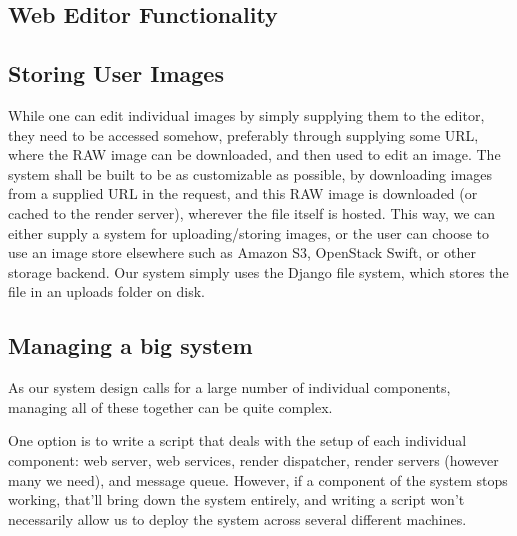 \documentclass[12pt,a4paper]{article}
\begin{document}
\subsection{Web Editor Functionality}


\subsection{Storing User Images}
While one can edit individual images by simply supplying them to the editor, they need to be accessed somehow,
preferably through supplying some URL, where the RAW image can be downloaded, and then used to edit an image.
The system shall be built to be as customizable as possible, by downloading images from a supplied URL in the request,
and this RAW image is downloaded (or cached to the render server), wherever the file itself is hosted. This way, we can
either supply a system for uploading/storing images, or the user can choose to use an image store elsewhere such as Amazon
S3, OpenStack Swift, or other storage backend. Our system simply uses the Django file system, which stores the file in an
uploads folder on disk.



\subsection{Managing a big system}
As our system design calls for a large number of individual components, managing all of these together can be quite complex.

One option is to write a script that deals with the setup of each individual component: web server, web services, render dispatcher, render servers (however many we need),
and message queue. However, if a component of the system stops working, that'll bring down the system entirely, and writing a script won't necessarily allow us to deploy the system
across several different machines.
\end{document}
